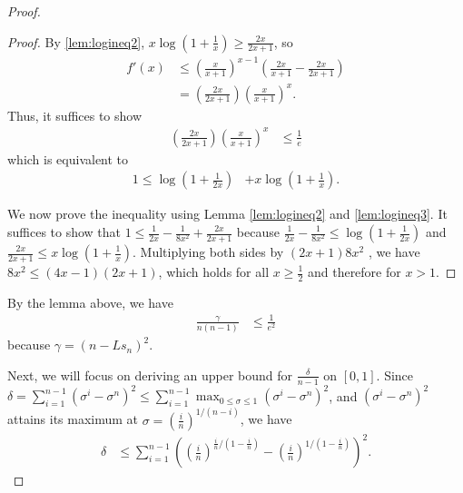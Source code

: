 \documentclass{article}
\theoremstyle{plain}
\theoremstyle{definition}
\theoremstyle{remark}
\def\bigopen#1{\left(#1\right)}
\begin{document}
\begin{proof}
\begin{proof}
By \cref{lem:logineq2}, $x\log\bigopen{ 1+\frac{1}{x} }\ge \frac{2x}{2x+1}$, so \begin{align*}
    f'(x) &\le \bigopen{ \frac{x}{x+1} }^{x-1} \bigopen{ \frac{2x}{x+1} - \frac{2x}{2x+1} }\\
    &= \bigopen{ \frac{2x}{2x+1} } \bigopen{ \frac{x}{x+1} }^x.
\end{align*}
Thus, it suffices to show
\begin{align*}
    \bigopen{ \frac{2x}{2x+1} } \bigopen{ \frac{x}{x+1} }^x &\le \frac{1}{e}
\end{align*}
which is equivalent to 
\begin{align*}
    1\le \log\bigopen{ 1+\frac{1}{2x} } &+ x\log\bigopen{ 1+\frac{1}{x} }.
\end{align*}

We now prove the inequality using Lemma \ref{lem:logineq2} and \ref{lem:logineq3}. It suffices to show that $1\le \frac{1}{2x}-\frac{1}{8x^2}+\frac{2x}{2x+1}$
because $\frac{1}{2x}-\frac{1}{8x^2}\le \log\bigopen{ 1+\frac{1}{2x} }$ and $\frac{2x}{2x+1}\le x\log\bigopen{ 1 + \frac{1}{x} }$. Multiplying both sides by $(2x+1)8x^2$ , we have $8x^2\le (4x-1)(2x+1)$, which holds for all $x\ge \frac{1}{2}$ and therefore for $x>1$.
\end{proof}
By the lemma above, we have 
\begin{align}
    \frac{\gamma}{n(n-1)} &\le \frac{1}{e^2} \label{eq:gammaub}
\end{align}
because $\gamma = (n-Ls_n)^2$.

Next, we will focus on deriving an upper bound for $\frac{\delta}{n-1}$ on $[0, 1]$. Since $\delta=\sum_{i=1}^{n-1} (\sigma^i-\sigma^n)^2\le \sum_{i=1}^{n-1} \max_{0\le \sigma\le 1}(\sigma^i-\sigma^n)^2$, and $(\sigma^i - \sigma^n)^2$ attains its maximum at $\sigma = \bigopen{\frac{i}{n}}^{1/(n-i)}$, we have 
\begin{align*}
    \delta &\le \sum_{i=1}^{n-1} \bigopen{\bigopen{\frac{i}{n}}^{\frac{i}{n}/(1-\frac{i}{n})}-\bigopen{\frac{i}{n}}^{1/(1-\frac{i}{n})}}^2.
\end{align*}


\end{proof}
\end{document}
